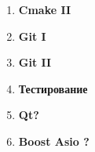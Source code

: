 \documentclass{article}
\begin{document}
\begin{enumerate}
\begin{enumerate}[a.]
\end{enumerate}
\newpage



\item \textbf{Cmake II}

\item \textbf{Git I}

\item \textbf{Git II}

\item \textbf{Тестирование}


\item \textbf{Qt?}
\item \textbf{Boost Asio ?}




\end{enumerate}
\end{document}
